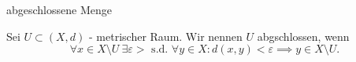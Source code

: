 \documentclass[class=article, crop=false]{standalone}
\begin{document}
\begin{zettel}{abgeschlossene Menge}
\begin{flashcard}
\begin{definition}[abgeschlossen]
    Sei $U \subset (X,d)$ - metrischer Raum.
    Wir nennen $U$ abgschlossen, wenn
\[
    \forall x \in  X \setminus U \  \exists \varepsilon > \text{ s.d. } \forall y \in X : d(x,y) < \varepsilon \implies y \in  X \setminus U
.\]
    
\end{definition}
\end{flashcard}
\end{zettel}
\end{document}
